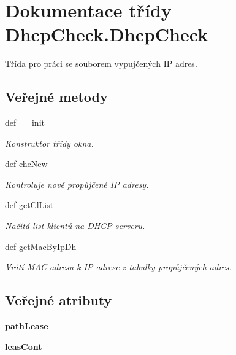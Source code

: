 \hypertarget{classDhcpCheck_1_1DhcpCheck}{\section{Dokumentace třídy Dhcp\-Check.\-Dhcp\-Check}
\label{df/db0/classDhcpCheck_1_1DhcpCheck}
}


Třída pro práci se souborem vypujčených I\-P adres.  


\subsection*{Veřejné metody}
\begin{DoxyCompactItemize}
\item 
def \hyperlink{classDhcpCheck_1_1DhcpCheck_a96437be47fab72ad232f68029e3ced97}{\-\_\-\-\_\-init\-\_\-\-\_\-}
\begin{DoxyCompactList}\small\item\em Konstruktor třídy okna. \end{DoxyCompactList}\item 
def \hyperlink{classDhcpCheck_1_1DhcpCheck_ad1c0e03ff71f3cf29f29667be833c33f}{chc\-New}
\begin{DoxyCompactList}\small\item\em Kontroluje nově propůjčené I\-P adresy. \end{DoxyCompactList}\item 
def \hyperlink{classDhcpCheck_1_1DhcpCheck_a77ee6b7f23e71d4ea91e0d97b398da43}{get\-Cl\-List}
\begin{DoxyCompactList}\small\item\em Načítá list klientů na D\-H\-C\-P serveru. \end{DoxyCompactList}\item 
def \hyperlink{classDhcpCheck_1_1DhcpCheck_ae1bfc1a6d8b07eb5d1166459d4e99330}{get\-Mac\-By\-Ip\-Dh}
\begin{DoxyCompactList}\small\item\em Vrátí M\-A\-C adresu k I\-P adrese z tabulky propůjčených adres. \end{DoxyCompactList}\end{DoxyCompactItemize}
\subsection*{Veřejné atributy}
\begin{DoxyCompactItemize}
\item 
\hypertarget{classDhcpCheck_1_1DhcpCheck_abbd6a49b6a89bb175a09dae1d4f5a543}{{\bfseries path\-Lease}}\label{df/db0/classDhcpCheck_1_1DhcpCheck_abbd6a49b6a89bb175a09dae1d4f5a543}

\item 
\hypertarget{classDhcpCheck_1_1DhcpCheck_a15d05487b6ddc97ecca4753336563fa0}{{\bfseries leas\-Cont}}\label{df/db0/classDhcpCheck_1_1DhcpCheck_a15d05487b6ddc97ecca4753336563fa0}

\end{DoxyCompactItemize}


